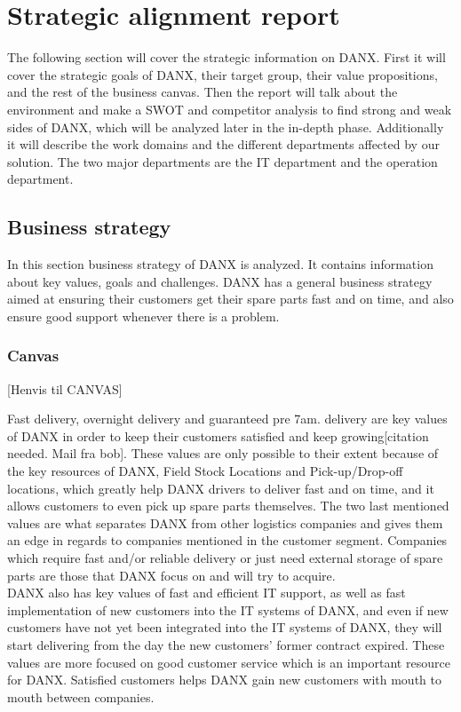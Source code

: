 \chapter{Strategic alignment report}
The following section will cover the strategic information on DANX. First it will cover the strategic goals of DANX, their target group, their value propositions, and the rest of the business canvas. 
Then the report will talk about the environment and make a SWOT and competitor analysis to find strong and weak sides of DANX, which will be analyzed later in the in-depth phase.
Additionally it will describe the work domains and the different departments affected by our solution. The two major departments are the IT department and the operation department.

\section{Business strategy}
In this section business strategy of DANX is analyzed. It contains information about key values, goals and challenges.
DANX has a general business strategy aimed at ensuring their customers get their spare parts fast and on time, and also ensure good support whenever there is a problem.

\subsection{Canvas}

[Henvis til CANVAS]

Fast delivery, overnight delivery and guaranteed pre 7am. delivery are key values of DANX in order to keep their customers satisfied and keep growing[citation needed. Mail fra bob]. These values are only possible to their extent because of the key resources of DANX, Field Stock Locations and Pick-up/Drop-off locations, which greatly help DANX drivers to deliver fast and on time, and it allows customers to even pick up spare parts themselves. The two last mentioned values are what separates DANX from other logistics companies and gives them an edge in regards to companies mentioned in the customer segment. Companies which require fast and/or reliable delivery or just need external storage of spare parts are those that DANX focus on and will try to acquire.\\
DANX also has key values of fast and efficient IT support, as well as fast implementation of new customers into the IT systems of DANX, and even if new customers have not yet been integrated into the IT systems of DANX, they will start delivering from the day the new customers' former contract expired. These values are more focused on good customer service which is an important resource for DANX. Satisfied customers helps DANX gain new customers with mouth to mouth between companies.

